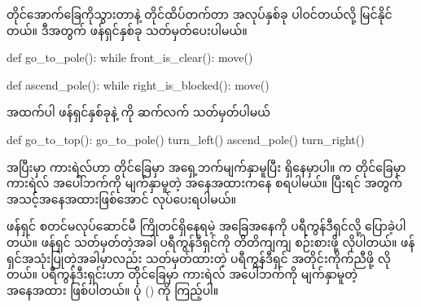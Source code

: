 %
တိုင်အောက်ခြေကိုသွားတာနဲ့ တိုင်ထိပ်တက်တာ အလုပ်နှစ်ခု ပါဝင်တယ်လို့ မြင်နိုင်တယ်။ ဒီအတွက် ဖန်ရှင်နှစ်ခု သတ်မှတ်ပေးပါမယ်။
%
\begin{py}
def go_to_pole():
    while front_is_clear():
        move()
\end{py}
%
%
\begin{py}
def ascend_pole():
    while right_is_blocked():
        move()
\end{py}
%
အထက်ပါ ဖန်ရှင်နှစ်ခုနဲ့  ကို ဆက်လက် သတ်မှတ်ပါမယ်
%
\begin{py}
def go_to_top():
    go_to_pole()
    turn_left()
    ascend_pole()
    turn_right()
\end{py}
%
 အပြီးမှာ ကားရဲလ်ဟာ တိုင်ခြေမှာ အရှေ့ဘက်မျက်နှာမူပြီး ရှိနေမှာပါ။  က တိုင်ခြေမှာ ကားရဲလ် အပေါ်ဘက်ကို မျက်နှာမူတဲ့ အနေအထားကနေ စရပါမယ်။  ပြီးရင်  အတွက် အသင့်အနေအထားဖြစ်အောင်  လုပ်ပေးရပါမယ်။

ဖန်ရှင် စတင်မလုပ်ဆောင်မီ ကြိုတင်ရှိနေရမဲ့ အခြေအနေကို ပရီကွန်ဒီရှင်လို့ ပြောခဲ့ပါတယ်။ ဖန်ရှင် သတ်မှတ်တဲ့အခါ ပရီကွန်ဒီရှင်ကို တိတိကျကျ စဉ်းစားဖို့ လိုပါတယ်။ ဖန်ရှင်အသုံးပြုတဲ့အခါမှာလည်း သတ်မှတ်ထားတဲ့ ပရီကွန်ဒီရှင် အတိုင်းကိုက်ညီဖို့ လိုတယ်။  ပရီကွန်ဒီးရှင်းဟာ တိုင်ခြေမှာ ကားရဲလ် အပေါ်ဘက်ကို မျက်နှာမူတဲ့ အနေအထား ဖြစ်ပါတယ်။ ပုံ \fRefNo{\ref{fig:mutp_pre_and_post}} () ကို ကြည့်ပါ။ %

